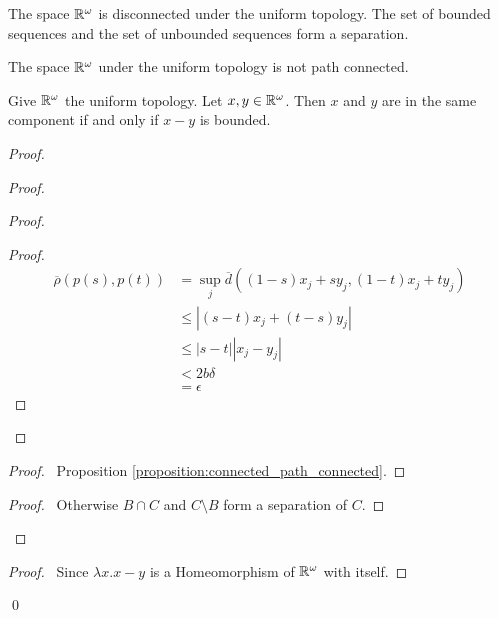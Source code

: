 \begin{example}
    The space $\mathbb{R}^\omega$ is disconnected under the uniform topology. The set of bounded sequences and the set of unbounded sequences form a separation.
\end{example}

\begin{corollary}
    The space $\mathbb{R}^\omega$ under the uniform topology is not
    path connected.
\end{corollary}

\begin{proposition}
    Give $\mathbb{R}^\omega$ the uniform topology. Let $x, y \in \mathbb{R}^\omega$. Then $x$ and $y$ are in the same component if and only if $x-y$ is bounded.
\end{proposition}

\begin{proof}
    \pf
    \begin{proof}
        \begin{proof}
            \begin{proof}
                \pf
                \begin{align*}
                    \overline{\rho}(p(s),p(t)) & = \sup_j \overline{d}((1-s)x_j + sy_j, (1-t)x_j + ty_j) \\
                    & \leq |(s-t)x_j + (t-s)y_j| \\
                    & \leq |s-t| |x_j - y_j| \\
                    & < 2b \delta \\
                    & = \epsilon
                \end{align*}
            \end{proof}
        \end{proof}
        \begin{proof}
            \pf\ Proposition \ref{proposition:connected_path_connected}.
        \end{proof}
        \begin{proof}
            \pf\ Otherwise $B \cap C$ and $C \setminus B$ form a separation of $C$.
        \end{proof}
    \end{proof}
    \qedstep
    \begin{proof}
        \pf\ Since $\lambda x. x-y$ is a Homeomorphism of $\mathbb{R}^\omega$ with itself.
    \end{proof}
    \qed
\end{proof}


